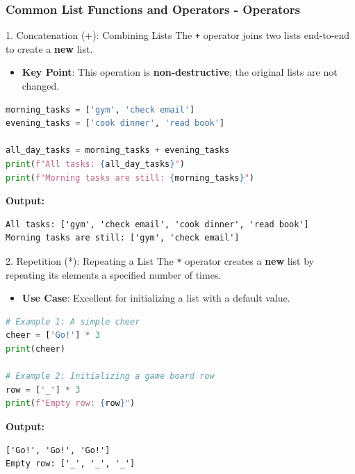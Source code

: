 \documentclass{beamer}
\begin{document}
\begin{frame}[fragile]
    \frametitle{Common List Functions and Operators - Operators}

    \begin{block}{1. Concatenation (+): Combining Lists}
        The \texttt{+} operator joins two lists end-to-end to create a \textbf{new} list.
        \begin{itemize}
            \item \textbf{Key Point}: This operation is \textbf{non-destructive}; the original lists are not changed.
        \end{itemize}
\begin{lstlisting}[language=Python]
morning_tasks = ['gym', 'check email']
evening_tasks = ['cook dinner', 'read book']

all_day_tasks = morning_tasks + evening_tasks
print(f"All tasks: {all_day_tasks}")
print(f"Morning tasks are still: {morning_tasks}")
\end{lstlisting}
    \textbf{Output:}
\begin{verbatim}
All tasks: ['gym', 'check email', 'cook dinner', 'read book']
Morning tasks are still: ['gym', 'check email']
\end{verbatim}
    \end{block}

    \pause

    \begin{block}{2. Repetition (*): Repeating a List}
        The \texttt{*} operator creates a \textbf{new} list by repeating its elements a specified number of times.
        \begin{itemize}
            \item \textbf{Use Case}: Excellent for initializing a list with a default value.
        \end{itemize}
\begin{lstlisting}[language=Python]
# Example 1: A simple cheer
cheer = ['Go!'] * 3
print(cheer)

# Example 2: Initializing a game board row
row = ['_'] * 3
print(f"Empty row: {row}")
\end{lstlisting}
    \textbf{Output:}
\begin{verbatim}
['Go!', 'Go!', 'Go!']
Empty row: ['_', '_', '_']
\end{verbatim}
    \end{block}
\end{frame}
\end{document}
